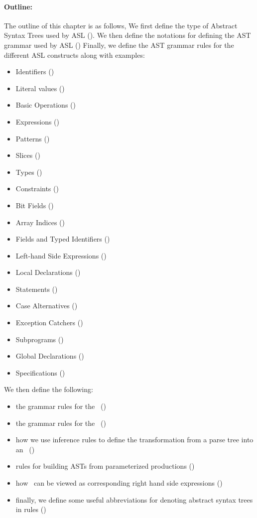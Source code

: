 \paragraph{Outline:}
The outline of this chapter is as follows,
We first define the type of Abstract Syntax Trees used by ASL ().
We then define the notations for defining the AST grammar used by ASL ()
Finally, we define the AST grammar rules for the different ASL constructs along with examples:
\begin{itemize}
  \item Identifiers ()
  \item Literal values ()
  \item Basic Operations ()
  \item Expressions ()
  \item Patterns ()
  \item Slices ()
  \item Types ()
  \item Constraints ()
  \item Bit Fields ()
  \item Array Indices ()
  \item Fields and Typed Identifiers ()
  \item Left-hand Side Expressions ()
  \item Local Declarations ()
  \item Statements ()
  \item Case Alternatives ()
  \item Exception Catchers ()
  \item Subprograms ()
  \item Global Declarations ()
  \item Specifications ()
\end{itemize}
We then define the following:
\begin{itemize}
\item the grammar rules for the \untypedast\ ()
\item the grammar rules for the \typedast\ ()
\item how we use inference rules to define the transformation from a parse tree into an \untypedast\ ()
\item rules for building ASTs from parameterized productions ()
\item how \assignableexpressions\ can be viewed as corresponding right hand side expressions ()
\item finally, we define some useful abbreviations for denoting abstract syntax trees in rules ()
\end{itemize}

